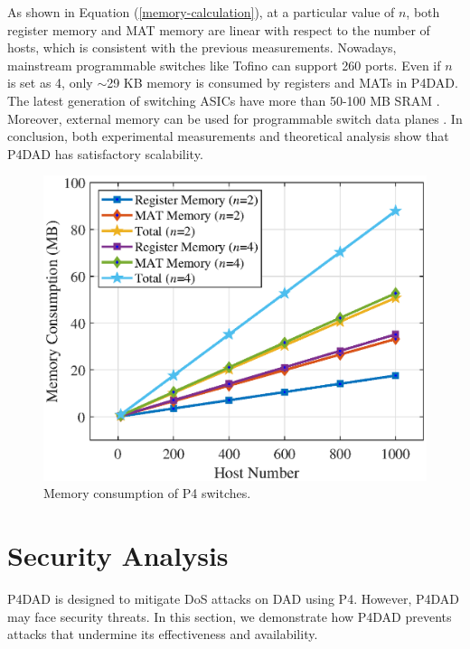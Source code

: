 \documentclass[a4paper,fleqn]{cas-dc}
\begin{document}
            As shown in Equation (\ref{memory-calculation}), at a particular value of $n$, both register memory and MAT memory are linear with respect to the number of hosts, which is consistent with the previous measurements.
            Nowadays, mainstream programmable switches like Tofino \cite{tofino} can support 260 ports. Even if $n$ is set as 4, only $\sim$29 KB memory is consumed by registers and MATs in P4DAD.
            The latest generation of switching ASICs have more than 50-100 MB SRAM \cite{DBLP:conf/sigcomm/MiaoZKLY17}.
            Moreover, external memory can be used for programmable switch data planes \cite{DBLP:conf/hotnets/KimZKLS18}.
            In conclusion, both experimental measurements and theoretical analysis show that P4DAD has satisfactory scalability.
            
            \begin{figure}
            \centerline{
                \includegraphics[scale=0.6]{figure/MemoryConsumption.eps}
            }
            \caption{Memory consumption of P4 switches.}
            \label{fig:Memory-Consumption}
            \end{figure}



\section{Security Analysis}\label{sec:security analysis}
    P4DAD is designed to mitigate DoS attacks on DAD using P4. However, P4DAD may face security threats. In this section, we demonstrate how P4DAD prevents attacks that undermine its effectiveness and availability. 
\end{document}
